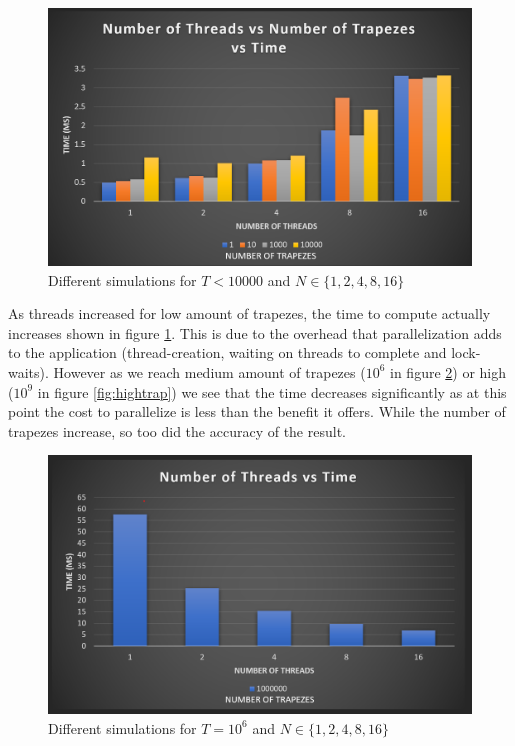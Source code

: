 \begin{figure}
  \centering
  \includegraphics[width=\linewidth]{Figures/lowTrap.png}
  \caption{Different simulations for $T<10000$ and $N \in \{1, 2, 4, 8, 16\}$}
  \label{fig:lowtrap}
\end{figure}

As threads increased for low amount of trapezes, the time to compute actually 
increases shown in figure \ref{fig:lowtrap}. This is due to the overhead that 
parallelization adds to the application (thread-creation, waiting on threads 
to complete and lock-waits). However as we reach medium amount of trapezes 
($10^6$ in figure \ref{fig:medtrap}) or high ($10^9$ in figure \ref{fig:hightrap}) we see that the time decreases significantly as 
at this point the cost to parallelize is less than the benefit it offers. 
While the number of trapezes increase, so too did the accuracy of the result.

\begin{figure}
  \centering
  \includegraphics[width=\linewidth]{Figures/medTrap.png}
  \caption{Different simulations for $T=10^6$ and $N \in \{1, 2, 4, 8, 16\}$}
  \label{fig:medtrap}
\end{figure}

